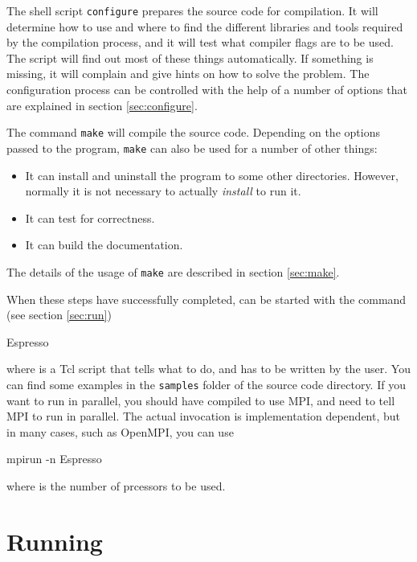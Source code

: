 The shell script \texttt{configure} prepares the source code for
compilation. It will determine how to use and where to find the
different libraries and tools required by the compilation process, and
it will test what compiler flags are to be used.  The script will find
out most of these things automatically.  If something is missing, it
will complain and give hints on how to solve the problem.  The
configuration process can be controlled with the help of a number of
options that are explained in section \vref{sec:configure}.

The command \texttt{make} will compile the source code. Depending on
the options passed to the program, \texttt{make} can also be used for
a number of other things:
\begin{itemize}
\item It can install and uninstall the program to some other
  directories. However, normally it is not necessary to actually
  \textit{install} \es to run it.
\item It can test \es for correctness.
\item It can build the documentation.
\end{itemize}
The details of the usage of \texttt{make} are described in section
\vref{sec:make}.

When these steps have successfully completed, \es can be started
with the command (see section \vref{sec:run})
\begin{code}
Espresso 
\end{code}
where  is a Tcl script that tells \es what to do, and
has to be written by the user. You can find some examples in the
\texttt{samples} folder of the source code directory.
If you want to run in parallel, you should have compiled \es to use
MPI, and need to tell MPI to run \es in parallel. The actual
invocation is implementation dependent, but in many cases, such as
OpenMPI, you can use
\begin{code}
mpirun -n  Espresso 
\end{code}
where  is the number of prcessors to be used.


\section{Running \es}

